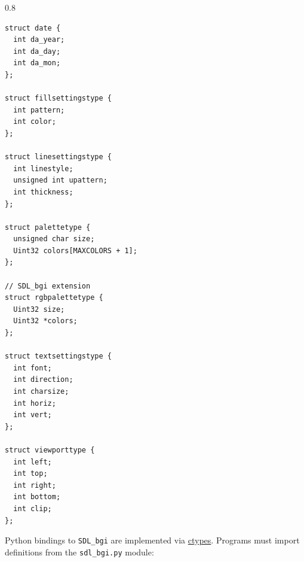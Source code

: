 \documentclass[a4paper,12pt]{article}
\newcommand{\ntt}[1]{\texttt{#1}}
\newcommand{\T}[1]{\ntt{#1}}         %
\newcommand{\SDLbgi}{\texttt{SDL\_bgi}}
\newenvironment{margins}[2]
{ %
\begin{list}{}
{
\setlength{\leftmargin}{#1}
\setlength{\rightmargin}{#2}
} \item
} %
{\end{list}}
\begin{document}
\begin{margins}{-0.5cm}{-0.5cm}
\begin{spacing}{0.8}
\begin{lstlisting}
struct date {
  int da_year;
  int da_day;
  int da_mon;
};

struct fillsettingstype {
  int pattern;
  int color;
};

struct linesettingstype {
  int linestyle;
  unsigned int upattern;
  int thickness;
};

struct palettetype {
  unsigned char size;
  Uint32 colors[MAXCOLORS + 1];
};

// SDL_bgi extension
struct rgbpalettetype {
  Uint32 size;
  Uint32 *colors;
};

struct textsettingstype {
  int font;
  int direction;
  int charsize;
  int horiz;
  int vert;
};

struct viewporttype {
  int left;
  int top;
  int right;
  int bottom;
  int clip;
};
\end{lstlisting}
\end{spacing}

\end{margins}

Python bindings to \SDLbgi{} are implemented via
\href{https://docs.python.org/3/library/ctypes.html}{ctypes}. Programs
must import definitions from the \T{sdl\_bgi.py} module:

\lstset{language=Python}
\end{document}
